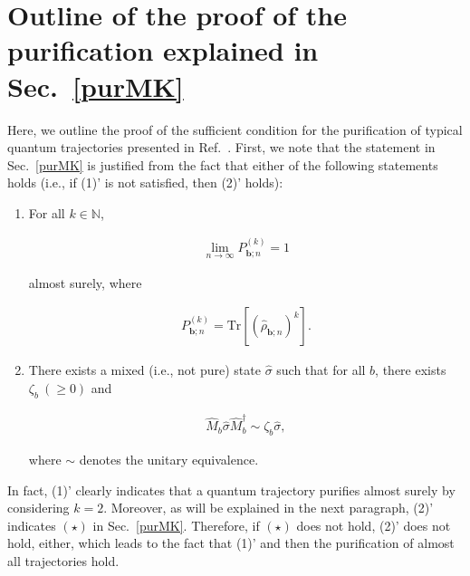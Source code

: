 \documentclass[preprint,pteplogo]{ptephy_v2}%
\numberwithin{equation}{section}
\theoremstyle{definition}
\newcommand{\mr}[1]{\mathrm{#1}}
\newcommand{\mbb}[1]{\mathbb{#1}}
\newcommand{\lrs}[1]{\left( #1 \right)}
\newcommand{\lrl}[1]{\left[ #1 \right]}
\newcommand{\aln}[1]{
\begin{align}
#1
\end{align}
}
\newcommand{\ra}{\rightarrow}
\newcommand{\Tr}{\mr{Tr}}
\begin{document}
\section{Outline of the proof of the purification explained in Sec.~\ref{purMK}} 
\label{app:pur}
Here, we outline the proof of the sufficient condition for the purification of typical quantum trajectories presented in Ref.~\cite{maassen2006purification}.
First, we note that the statement in Sec.~\ref{purMK} is justified from the fact that either of the following statements holds (i.e., if (1)' is not satisfied, then (2)' holds):
\begin{enumerate}
\renewcommand{\labelenumi}{(\arabic{enumi})'}
\item 
For all $k\in\mbb{N}$,
\aln{
\lim_{n\ra\infty}P_{\bm{b};n}^{(k)}= 1
}    
almost surely, where
\aln{
P_{\bm{b};n}^{(k)}=\Tr\lrl{\lrs{\hat{\rho}_{\bm{b};n}}^k}.
}

\item
There exists a mixed (i.e., not pure) state $\hat{\sigma}$ such that for all $b$, there exists $\zeta_b\:(\geq 0)$ and
\aln{
\hat{M}_b\hat{\sigma}\hat{M}_b^\dag\sim\zeta_b\hat{\sigma},
}
where $\sim$ denotes the unitary equivalence.
\end{enumerate}
In fact, (1)' clearly indicates that a quantum trajectory purifies almost surely by considering $k=2$.
Moreover, as will be explained in the next paragraph, (2)' indicates $(\star)$ in Sec.~\ref{purMK}.
Therefore, if $(\star)$ does not hold, (2)' does not hold, either, which leads to the fact that (1)' and then the purification of almost all trajectories hold.
\end{document}

